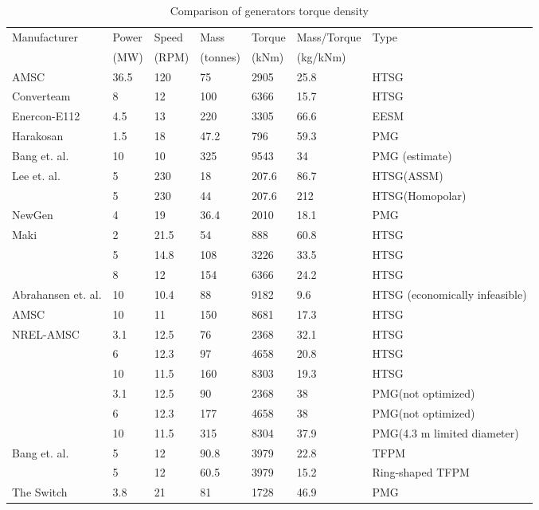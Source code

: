 \documentclass[final,peerreview,onecolumn]{IEEEtran}
\begin{document}
\begin{table}[t]
\caption{Comparison of generators torque density}
\label{generators_list}
\centering
\begin{tabular}{lllllll}
\hline
Manufacturer & Power & Speed & Mass & Torque & Mass/Torque & Type \\
 & (MW) & (RPM) & (tonnes) & (kNm) & (kg/kNm) & \\
\hline
\hline
AMSC \cite{Kalsi2006} & 36.5 & 120 & 75 & 2905 & 25.8 & HTSG \\
Converteam \cite{Lewis2007} & 8 & 12 & 100 & 6366 & 15.7 & HTSG  \\
Enercon-E112 \cite{Bang2008} & 4.5 & 13 & 220 & 3305 & 66.6 & EESM \\
Harakosan \cite{Duan2009}& 1.5 & 18 & 47.2 & 796 & 59.3 & PMG \\
Bang et. al. \cite{Bang2008} & 10 & 10 & 325 & 9543 & 34 & PMG (estimate)  \\
Lee et. al. \cite{Lee2008} & 5 & 230 & 18 & 207.6 & 86.7 &  HTSG(ASSM)  \\
 & 5 & 230 & 44 & 207.6 & 212 & HTSG(Homopolar)  \\
NewGen \cite{Engstrom2004} & 4 & 19 & 36.4 & 2010 & 18.1 & PMG  \\
Maki \cite{Maki2008} & 2 & 21.5 & 54 & 888 & 60.8 & HTSG  \\
 & 5 & 14.8 & 108 & 3226 & 33.5 & HTSG \\
 & 8 & 12 & 154 & 6366 & 24.2 & HTSG  \\
Abrahansen et. al. \cite{Abrahamsen2010}& 10 & 10.4 & 88 & 9182 & 9.6 & HTSG (economically infeasible)  \\
AMSC \cite{Snitchler2010} & 10 & 11 & 150 & 8681 & 17.3 & HTSG  \\
NREL-AMSC \cite{Maples2010} & 3.1 & 12.5 & 76 & 2368 & 32.1 & HTSG  \\
 & 6 & 12.3 & 97 & 4658 & 20.8 & HTSG  \\
 & 10 & 11.5 & 160 & 8303 & 19.3 & HTSG  \\
 & 3.1 & 12.5 & 90 & 2368 & 38 & PMG(not optimized)  \\
 & 6 & 12.3 & 177 & 4658 & 38 &  PMG(not optimized) \\
 & 10 & 11.5 & 315 & 8304 & 37.9 & PMG(4.3 m limited diameter)  \\
Bang et. al. \cite{Bang2009} & 5 & 12 & 90.8 & 3979 & 22.8 & TFPM  \\
 & 5 & 12 & 60.5 & 3979 & 15.2 & Ring-shaped TFPM  \\
The Switch \cite{Duan2009} & 3.8 & 21 & 81 & 1728 & 46.9 & PMG  \\
\hline
\end{tabular}
\end{table}
\end{document}
